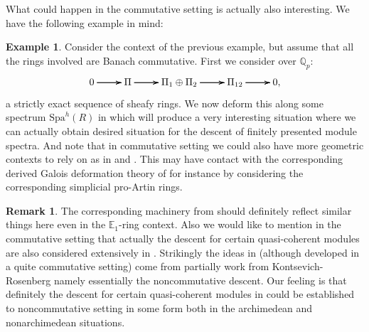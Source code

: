 \documentclass[12pt]{amsart}
\theoremstyle{definition}
\newtheorem{remark}[theorem]{Remark}
\numberwithin{equation}{section}
\newtheorem{example}[theorem]{Example}
\begin{document}
\indent What could happen in the commutative setting is actually also interesting. We have the following example in mind:


\begin{example}
Consider the context of the previous example, but assume that all the rings involved are Banach commutative. First we consider over $\mathbb{Q}_p$:
\[
\xymatrix@C+0pc@R+0pc{
0 \ar[r] \ar[r] \ar[r] &\Pi \ar[r] \ar[r] \ar[r] &\Pi_1\oplus \Pi_2  \ar[r] \ar[r] \ar[r] &\Pi_{12} \ar[r] \ar[r] \ar[r] &0,  
}
\]		
a strictly exact sequence of sheafy rings. We now deform this along some spectrum $\mathrm{Spa}^h(R)$ in \cite{BK} which will produce a very interesting situation where we can actually obtain desired situation for the descent of finitely presented module spectra. And note that in commutative setting we could also have more geometric contexts to rely on as in \cite{BK} and \cite{BBBK}. This may have contact with the corresponding derived Galois deformation theory of \cite{GV} for instance by considering the corresponding simplicial pro-Artin rings.
\end{example}



\begin{remark}
The corresponding machinery from \cite{CS} should definitely reflect similar things here even in the $\mathbb{E}_1$-ring context. Also we would like to mention in the commutative setting that actually the descent for certain quasi-coherent modules are also considered extensively in \cite{BBK}. Strikingly the ideas in \cite{BBK} (although developed in a quite commutative setting) come from partially work from Kontsevich-Rosenberg \cite{KR} namely essentially the noncommutative descent. Our feeling is that definitely the descent for certain quasi-coherent modules in \cite{BBBK} could be established to noncommutative setting in some form both in the archimedean and nonarchimedean situations. 
\end{remark}















\end{document}
